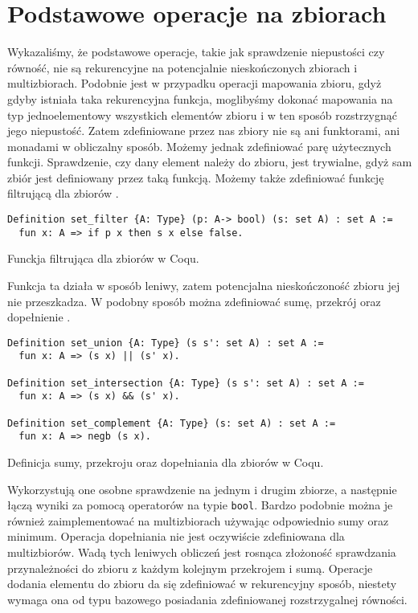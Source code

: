 \section{Podstawowe operacje na zbiorach}
Wykazaliśmy, że podstawowe operacje, takie jak sprawdzenie niepustości czy równość, nie są rekurencyjne na potencjalnie nieskończonych zbiorach i multizbiorach. Podobnie jest w przypadku operacji mapowania zbioru, gdyż gdyby istniała taka rekurencyjna funkcja, moglibyśmy dokonać mapowania na typ jednoelementowy wszystkich elementów zbioru i w ten sposób rozstrzygnąć jego niepustość. Zatem zdefiniowane przez nas zbiory nie są ani funktorami, ani monadami w obliczalny sposób. Możemy jednak zdefiniować parę użytecznych funkcji. Sprawdzenie, czy dany element należy do zbioru, jest trywialne, gdyż sam zbiór jest definiowany przez taką funkcją. Możemy także zdefiniować funkcję filtrującą dla zbiorów \cite{set_filter}.
\begin{code}
\begin{verbatim}
Definition set_filter {A: Type} (p: A-> bool) (s: set A) : set A :=
  fun x: A => if p x then s x else false.
\end{verbatim}
\caption{Funckja filtrująca dla zbiorów w Coqu.}
\label{set_filter}
\end{code}
Funkcja ta działa w sposób leniwy, zatem potencjalna nieskończoność zbioru jej nie przeszkadza. W podobny sposób można zdefiniować sumę, przekrój oraz dopełnienie \cite{set_union}.
\begin{code}
\begin{verbatim}
Definition set_union {A: Type} (s s': set A) : set A :=
  fun x: A => (s x) || (s' x).

Definition set_intersection {A: Type} (s s': set A) : set A :=
  fun x: A => (s x) && (s' x).

Definition set_complement {A: Type} (s: set A) : set A :=
  fun x: A => negb (s x).
\end{verbatim}
\caption{Definicja sumy, przekroju oraz dopełniania dla zbiorów w Coqu.}
\label{set_union}
\end{code}
Wykorzystują one osobne sprawdzenie na jednym i drugim zbiorze, a następnie łączą wyniki za pomocą operatorów na typie \texttt{bool}. Bardzo podobnie można je również zaimplementować na multizbiorach używając odpowiednio sumy oraz minimum. Operacja dopełniania nie jest oczywiście zdefiniowana dla multizbiorów. Wadą tych leniwych obliczeń jest rosnąca złożoność sprawdzania przynależności do zbioru z każdym kolejnym przekrojem i sumą. Operacje dodania elementu do zbioru da się zdefiniować w rekurencyjny sposób, niestety wymaga ona od typu bazowego posiadania zdefiniowanej rozstrzygalnej równości.
